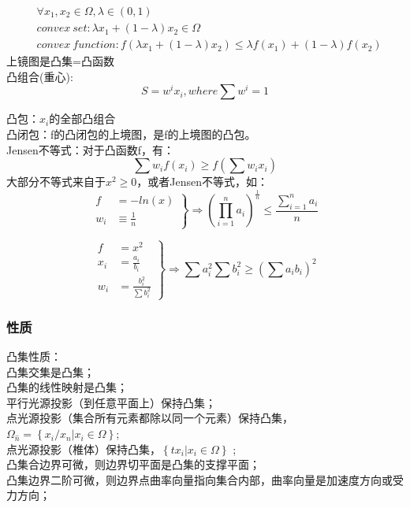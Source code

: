\documentclass[UTF8]{../computerUniverse}
\begin{document}
\begin{equation}
\begin{split}
&\forall x_1,x_2 \in \Omega,\lambda \in (0,1)\\
&convex \ set: \lambda x_1 +(1-\lambda)x_2 \in \Omega\\
&convex \ function: f \left( \lambda x_1+(1-\lambda)x_2 \right)\leqslant
\lambda f(x_1)+(1-\lambda)f(x_2)
\end{split}
\end{equation}
上镜图是凸集=凸函数\\   

凸组合(重心):
\begin{equation}
S=w^ix_i, where \sum w^i=1
\end{equation} 

凸包：$x_i$的全部凸组合\\
凸闭包：f的凸闭包的上境图，是f的上境图的凸包。\\
Jensen不等式：对于凸函数f，有：
\begin{equation}
\sum w_if \left( x_i \right)\geqslant f \left( \sum w_ix_i \right)
\end{equation}
大部分不等式来自于$ x^2\geqslant0$，或者Jensen不等式，如：
\begin{equation}
\left.
\begin{aligned}
f&=-ln(x) \\
w_i& \equiv \frac{1}{n}
\end{aligned}
 \right\} \Rightarrow
 \left( \prod_{i=1}^{n} a_i  \right)^{\frac{1}{n}}\leqslant \frac{\sum\limits_{i=1}^na_i}{n}
\end{equation}

\begin{equation}
    \left.
    \begin{aligned}
    f&=x^2 \\
    x_i&=\frac{a_i}{b_i} \\
    w_i&=\frac{b_i^2}{\sum b_i^2}
    \end{aligned}
     \right\} \Rightarrow
     \sum a_i^2 \sum b_i^2 \geqslant \left( \sum a_ib_i \right)^2
\end{equation}

\subsubsection{性质}
凸集性质：\\
凸集交集是凸集；\\
凸集的线性映射是凸集；\\
平行光源投影（到任意平面上）保持凸集；\\
点光源投影（集合所有元素都除以同一个元素）保持凸集，
$\Omega _{\hat{n}}=\left\{ x_i/x_n |x_i\in \Omega \right \} $;\\
点光源投影（椎体）保持凸集，$\left\{ tx_i |x_i\in \Omega \right\}$ ;\\
凸集合边界可微，则边界切平面是凸集的支撑平面；\\
凸集边界二阶可微，则边界点曲率向量指向集合内部，曲率向量是加速度方向或受力方向；\\
\end{document}
